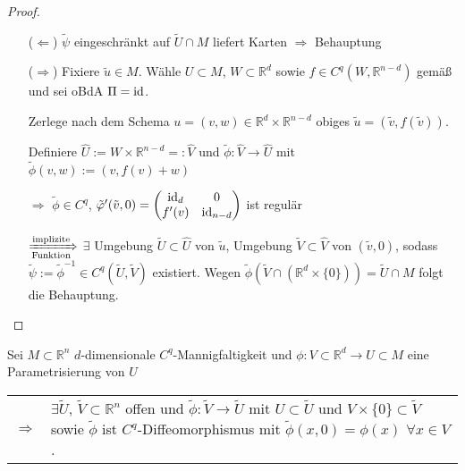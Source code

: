 \begin{proof}\hspace*{0pt}
	\vspace*{\dimexpr-\baselineskip+1mm\relax}
	\begin{itemize}
		\item[($\Leftarrow$)] $\tilde{\psi}$ eingeschränkt auf $\tilde{U}\cap M$ liefert Karten $\Rightarrow$ Behauptung
		\item[($\Rightarrow$)] Fixiere $\tilde{u}\in M$. Wähle $U\subset M$, $W\subset \mathbb{R}^d$ sowie $f\in C^q(W, \mathbb{R}^{n-d})$ gemäß  und sei oBdA $\Pi = \operatorname{id}$.
		
		Zerlege nach dem Schema $u=(v,w)\in \mathbb{R}^{d}\times\mathbb{R}^{n-d}$ obiges $\tilde{u} = (\tilde{v}, f(\tilde{v}))$.
		
		Definiere $\hat{U} := W\times \mathbb{R}^{n-d} =: \hat{V}$ und $\tilde{\phi}\colon \hat{V} \to \hat{U}$ mit $\tilde{\phi}(v,w) := (v, f(v) + w)$
		
		$\Rightarrow$ $\tilde{\phi}\in C^q$, $\tilde{\varphi}'(\tilde{v}, 0) = \begin{pmatrix}
			\operatorname{id}_{d} & 0 \\ f'(v) & \operatorname{id}_{n-d}
		\end{pmatrix}$ ist regulär
		
		$\xRightarrow[\text{Funktion}]{\text{implizite}}$ $\exists$ Umgebung $\tilde{U}\subset \hat{U}$ von $\tilde{u}$, Umgebung $\tilde{V}\subset \hat{V}$ von $(\tilde{v}, 0)$, sodass $\tilde{\psi} := \tilde{\phi}^{-1} \in C^q(\tilde{U}, \tilde{V})$ existiert. Wegen $\tilde{\phi}(\tilde{V}\cap (\mathbb{R}^d\times \{ 0\})) = \tilde{U} \cap M$ folgt die Behauptung.
	\end{itemize}
\end{proof}

\begin{conclusion}
	Sei $M\subset\mathbb{R}^n$ $d$-dimensionale $C^q$-Mannigfaltigkeit und $\phi\colon V\subset \mathbb{R}^d\to U\subset M$ eine Parametrisierung von $U$
	
	\vspace*{-0.5\baselineskip}
	\begin{tabularx}{\linewidth}{@{}r@{\ \ }X}
	$\Rightarrow$ & $\exists \tilde{U}$, $\tilde{V}\subset\mathbb{R}^n$ offen und $\tilde{\phi}\colon \tilde{V}\to \tilde{U}$ mit $U\subset\tilde{U}$ und $V\times \{ 0\} \subset \tilde{V}$ sowie $\tilde{\phi}$ ist $C^q$-Diffeomorphismus mit $\tilde{\phi}(x,0) = \phi(x)$ $\forall x\in V$.
	\end{tabularx}
\end{conclusion}

